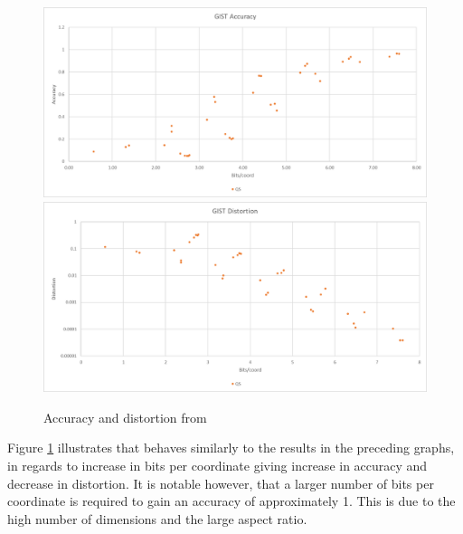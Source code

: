 \begin{figure}[h]
\includegraphics[width=\textwidth]{figures/graphs/gist_accuracy.png}
\includegraphics[width=\textwidth]{figures/graphs/gist_distortion.png}
\caption{Accuracy and distortion from \gist{}}
\label{fig:graph gist}
\end{figure}
Figure \ref{fig:graph gist} illustrates that \qs{} behaves similarly to the results in the preceding graphs, in regards to increase in bits per coordinate giving increase in accuracy and decrease in distortion. It is notable however, that a larger number of bits per coordinate is required to gain an accuracy of approximately 1. This is due to the high number of dimensions and the large aspect ratio.

